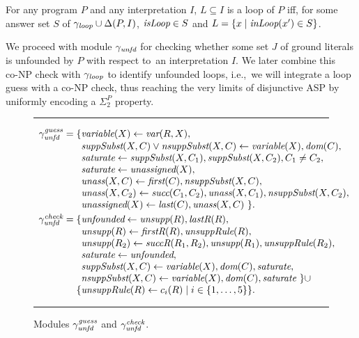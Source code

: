\documentclass{tlp}
\newcommand{\reif}[1]{\Delta(#1)}
\newcommand{\wrt}{with respect to}
\newcommand{\iec}{i.e.,\ }
\newcommand{\coNP}{\mbox{co-NP}}
\newcommand{\INPUT}{\reif{P,I}}
\newcommand{\Loop}{\mathit{LOOP}} \newcommand{\LoopGuess}{\mathit{LOOP_{guess}}} \newcommand{\LoopCheck}{\mathit{LOOP_{check}}} \newcommand{\LoopAux}{\mathit{LOOP_{aux}}} \renewcommand{\Loop}{\gamma_\mathit{loop}} \renewcommand{\LoopGuess}{\Loop^\mathit{guess}} \renewcommand{\LoopCheck}{\Loop^\mathit{check}} \renewcommand{\LoopAux}{\Loop^\mathit{aux}}
\newcommand{\Support}{\mathit{SUPPORT}} \newcommand{\SupportGuess}{\mathit{SUPPORT_{guess}}} \newcommand{\SupportCheck}{\mathit{SUPPORT_{check}}} \newcommand{\SupportAux}{\mathit{SUPPORT_{aux}}} \renewcommand{\Support}{\gamma_\mathit{unfd}} \renewcommand{\SupportGuess}{\Support^\mathit{guess}} \renewcommand{\SupportCheck}{\Support^\mathit{check}} \renewcommand{\SupportAux}{\Support^\mathit{aux}}
\renewcommand{\mathit}[1]{{\text{\it{#1}}}}
\begin{document}
\begin{theorem}\label{thm:loop}
For any program $P$ and any interpretation $I$,
$L \subseteq I$ is a loop of $P$ iff,
for some answer set $S$ of $\Loop \cup \INPUT$, $\mathit{isLoop} \in S$ and $L = \{x \mid \mathit{inLoop}(x') \in S\}$.
\end{theorem}



We proceed with module $\Support$ for
checking whether some set  $J$
of ground literals  is unfounded by $P$ \wrt\ an interpretation $I$.  
We later combine this $\coNP$ check  with $\Loop$ to
identify unfounded loops, \iec we will integrate a loop guess with a $\coNP$ check, thus reaching the very limits of disjunctive ASP by uniformly
encoding a $\Sigma^{P}_{2}$ property. 



\begin{figure}[t]
\begin{small}
\hrule
$$\begin{array}{r@{}l}
\SupportGuess  =  \{ &\mathit{variable}(X) \leftarrow  \mathit{var}(R,X),\\ 
&\mathit{suppSubst}(X,C) \vee \mathit{nsuppSubst}(X,C) \leftarrow \mathit{variable}(X), \mathit{dom}(C),\\
&\mathit{saturate} \leftarrow \mathit{suppSubst}(X,C_{1}), \mathit{suppSubst}(X,C_{2}), C_1 \neq C_2,\\ 
&\mathit{saturate} \leftarrow \mathit{unassigned}(X),\\
&\mathit{unass}(X,C)    \leftarrow \mathit{first}(C), \mathit{nsuppSubst}(X,C),\\ 
&\mathit{unass}(X,C_2)   \leftarrow \mathit{succ}(C_1,C_2), \mathit{unass}(X,C_1), \mathit{nsuppSubst}(X,C_2),\\ 
&\mathit{unassigned}(X) \leftarrow \mathit{last}(C), \mathit{unass}(X,C)\ \}\mbox{.} \\[.3em]
\SupportCheck  =  \{ &
\mathit{unfounded} \leftarrow \mathit{unsupp}(R), \mathit{lastR}(R),\\
&\mathit{unsupp}(R)   \leftarrow \mathit{firstR}(R), \mathit{unsuppRule}(R),\\
&\mathit{unsupp}(R_{2})  \leftarrow \mathit{succR}(R_{1},R_{2}), \mathit{unsupp}(R_{1}), \mathit{unsuppRule}(R_{2}),\\
& \mathit{saturate} \leftarrow \mathit{unfounded},\\
 &\mathit{suppSubst}(X,C)  \leftarrow \mathit{variable}(X),\mathit{dom}(C), \mathit{saturate},\\
&\mathit{nsuppSubst}(X,C) \leftarrow \mathit{variable}(X),\mathit{dom}(C), \mathit{saturate}\ \}\cup\\
\{&\mathit{unsuppRule}(R) \leftarrow c_{i}(R) \mid i \in \{1,\ldots, 5\}\}\mbox{.}
\end{array}$$
\hrule
\end{small}
\caption{Modules $\SupportGuess$ and  $\SupportCheck$\label{fig:SUPPORT}.}
\label{fig:support}
\end{figure}
\end{document}
